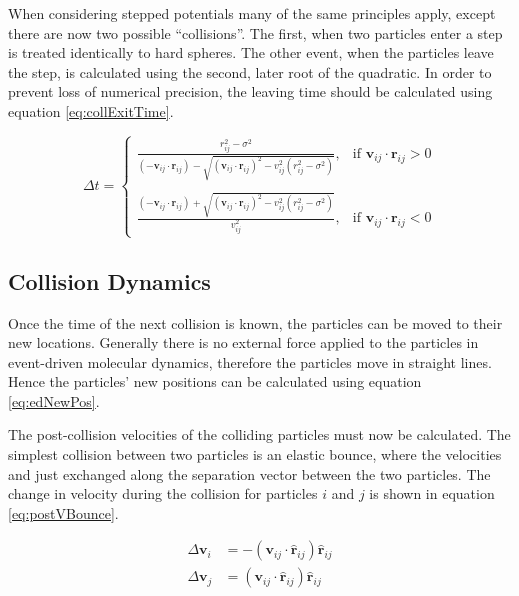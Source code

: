 \message{ !name(main.tex)}\documentclass[12pt]{UoAthesis}
\begin{document}
When considering stepped potentials many of the same principles apply,
except there are now two possible ``collisions''. The first, when two
particles enter a step is treated identically to hard spheres. The
other event, when the particles leave the step, is calculated using
the second, later root of the quadratic.  In order to prevent loss of
numerical precision, the leaving time should be calculated using
equation \eqref{eq:collExitTime}.

\begin{equation}
  \label{eq:collExitTime}
\Delta t = 
\begin{cases}
  \frac{r_{ij}^2 - \sigma^2}{(-\mathbf{v}_{ij}\cdot\mathbf{r}_{ij})
    - \sqrt{(\mathbf{v}_{ij}\cdot\mathbf{r}_{ij})^2 
      - v_{ij}^2(r_{ij}^2 - \sigma^2)}}, & \text{if }
  \mathbf{v}_{ij}\cdot\mathbf{r}_{ij} > 0 \\
\\

\frac{(-\mathbf{v}_{ij}\cdot\mathbf{r}_{ij}) +
  \sqrt{(\mathbf{v}_{ij}\cdot\mathbf{r}_{ij})^2 - v_{ij}^2(r_{ij}^2 - \sigma^2)}}
     {v_{ij}^2} , & \text{if }
     \mathbf{v}_{ij}\cdot\mathbf{r}_{ij} < 0 
\end{cases}
\end{equation}

\subsection{Collision Dynamics \label{sec:CollDyn}}
Once the time of the next collision is known, the particles can be moved
to their new locations.  Generally there is no external force applied
to the particles in event-driven molecular dynamics, therefore the
particles move in straight lines.  Hence the particles' new positions
can be calculated using equation \eqref{eq:edNewPos}.



The post-collision velocities of the colliding particles must now be
calculated.  The simplest collision between two particles is an
elastic bounce, where the velocities and just exchanged along the
separation vector between the two particles.  The change in velocity
during the collision for particles $i$ and $j$ is shown in equation
\eqref{eq:postVBounce}.

\begin{subequations}
  \label{eq:postVBounce}
  \begin{align}
    \Delta\mathbf{v}_i &= -(\mathbf{v}_{ij}\cdot\mathbf{\hat{r}}_{ij})\mathbf{\hat{r}}_{ij} \\
    \Delta\mathbf{v}_j &= (\mathbf{v}_{ij}\cdot\mathbf{\hat{r}}_{ij})\mathbf{\hat{r}}_{ij}
  \end{align}
\end{subequations}
\end{document}
